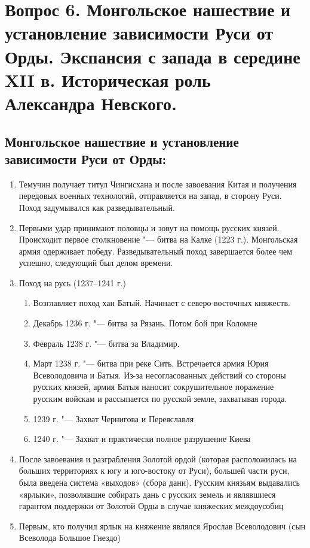 \section{Вопрос 6. Монгольское нашествие и установление зависимости Руси от Орды. Экспансия с запада в середине XII в. Историческая роль Александра Невского.}

\subsection{Монгольское нашествие и установление зависимости Руси от Орды:}

\begin{enumerate}
    \item{ Темучин получает титул Чингисхана и после завоевания Китая и получения передовых военных технологий, отправляется на запад, в сторону Руси. Поход задумывался как разведывательный.}
    \item{ Первыми удар принимают половцы и зовут на помощь русских князей. Происходит первое столкновение "--- битва на Калке (1223 г.). Монгольская армия одерживает победу. Разведывательный поход завершается более чем успешно, следующий был делом времени.}
    \item{ Поход на русь (1237--1241 г.)
        \begin{enumerate}
            \item{ Возглавляет поход хан Батый. Начинает с северо-восточных княжеств.}
            \item{ Декабрь 1236 г. "--- битва за Рязань. Потом бой при Коломне}
            \item{ Февраль 1238 г. "--- битва за Владимир.}
            \item{ Март 1238 г. "--- битва при реке Сить. Встречается армия Юрия Всеволодовича и Батыя. Из-за несогласованных действий со стороны русских князей, армия Батыя наносит сокрушительное поражение русским войскам и рассыпается по русской земле, захватывая города.}
            \item{ 1239 г. "--- Захват Чернигова и Переяславля}
            \item{ 1240 г. "--- Захват и практически полное разрушение Киева}
        \end{enumerate}
    }
    \item{ После завоевания и разграбления Золотой ордой (которая расположилась на больших территориях к югу и юго-востоку от Руси), большей части руси, была введена система «выходов» (сбора дани). Русским князьям выдавались «ярлыки», позволявшие собирать дань с русских земель и являвшиеся гарантом поддержки от Золотой Орды в случае княжеских междоусобиц}
    \item{ Первым, кто получил ярлык на княжение являлся Ярослав Всеволодович (сын Всеволода Большое Гнездо)}
\end{enumerate}

